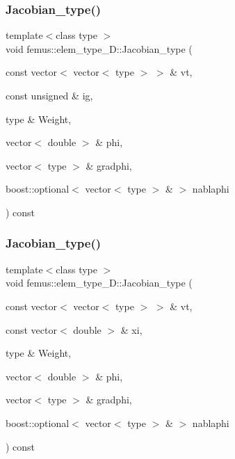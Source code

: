 \subsubsection{\texorpdfstring{Jacobian\+\_\+type()}{Jacobian\_type()}\hspace{0.1cm}{\footnotesize\ttfamily [1/2]}}
{\footnotesize\ttfamily template$<$class type $>$ \\
void femus\+::elem\+\_\+type\+\_\+D\+::\+Jacobian\+\_\+type (\begin{DoxyParamCaption}\item[{const vector$<$ vector$<$ type $>$ $>$ \&}]{vt,  }\item[{const unsigned \&}]{ig,  }\item[{type \&}]{Weight,  }\item[{vector$<$ double $>$ \&}]{phi,  }\item[{vector$<$ type $>$ \&}]{gradphi,  }\item[{boost\+::optional$<$ vector$<$ type $>$ \& $>$}]{nablaphi }\end{DoxyParamCaption}) const}

\mbox{\label{classfemus_1_1elem__type__2_d_aa05f28f91f1eb9e2c45bd01c3c44443f}} 
\subsubsection{\texorpdfstring{Jacobian\+\_\+type()}{Jacobian\_type()}\hspace{0.1cm}{\footnotesize\ttfamily [2/2]}}
{\footnotesize\ttfamily template$<$class type $>$ \\
void femus\+::elem\+\_\+type\+\_\+D\+::\+Jacobian\+\_\+type (\begin{DoxyParamCaption}\item[{const vector$<$ vector$<$ type $>$ $>$ \&}]{vt,  }\item[{const vector$<$ double $>$ \&}]{xi,  }\item[{type \&}]{Weight,  }\item[{vector$<$ double $>$ \&}]{phi,  }\item[{vector$<$ type $>$ \&}]{gradphi,  }\item[{boost\+::optional$<$ vector$<$ type $>$ \& $>$}]{nablaphi }\end{DoxyParamCaption}) const}

